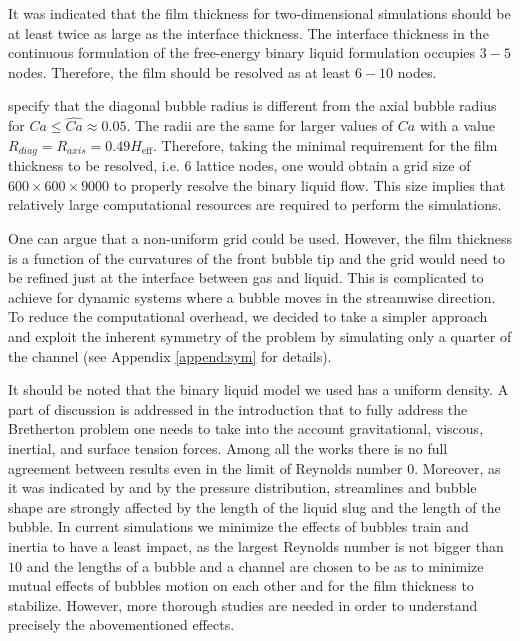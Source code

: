 \documentclass{article}
\begin{document}
It was indicated \cite{kuzmin-binary2d} that the film thickness for two-dimensional simulations should be at least twice as large
as the interface thickness. The interface thickness in the continuous formulation of the
free-energy binary liquid formulation occupies $3-5$ nodes. Therefore, the film should be
resolved as at least $6-10$ nodes. 

\citet{heil-threedim} specify that the diagonal bubble radius is different from the
axial bubble radius for $Ca\leq \widehat{Ca}\approx 0.05$. The radii are the same for larger values
of
$Ca$ with a value $R_{diag}=R_{axis}=0.49 H_{\mathrm{eff}}$. Therefore, taking the minimal
requirement for the film thickness to be
resolved, i.e. $6$ lattice nodes, one would obtain a grid size of $600\times 600 \times 9000 $ to
properly resolve the binary liquid flow. This size implies that relatively
large
computational resources are required to perform the simulations.

One can argue that a non-uniform grid could be used. However, the film thickness is a
function of the curvatures of the front bubble tip \cite{bretherton} and the grid would need to
be refined just at the interface between gas and liquid. This is complicated to achieve for
dynamic systems where a bubble moves in the streamwise direction.
To reduce the computational overhead, we decided to take a simpler approach and exploit the
inherent symmetry of the problem by simulating only a quarter of the channel (see Appendix
\ref{append:sym} for details).

It should be noted that the binary liquid model we used has a uniform density. A part of discussion is
addressed in the introduction that to fully address the Bretherton problem one needs to take into
the account gravitational, viscous, inertial, and surface tension forces. Among all the works there
is no full 
agreement between results even in the limit of Reynolds number $0$.  Moreover, as it was indicated
by \citet{kreutzer-taylor} and by \citet{cerro-train} the pressure distribution, streamlines and
bubble shape are strongly affected by the length of the liquid slug and the length of the bubble. 
In current simulations we minimize the effects of bubbles train and inertia to have a least impact,
as the largest Reynolds number is not bigger than $10$ and the lengths of a bubble and a channel are
chosen to be as to minimize mutual effects of bubbles motion on each other and for the film
thickness to stabilize. However, more thorough studies are needed in order to understand precisely
the abovementioned effects.
\end{document}
